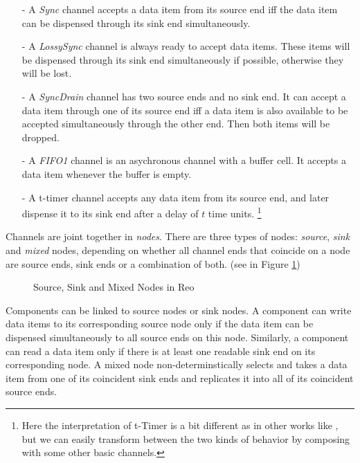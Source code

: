 \documentclass[conference, a4paper]{IEEEtran}
\begin{document}
\begin{itemize}
  \item [-] A \emph{Sync} channel accepts a data item from its source end iff the data item can be
    dispensed through its sink end simultaneously.
  \item [-] A \emph{LossySync} channel is always ready to accept data items. These items will be
    dispensed through its sink end simultaneously if possible, otherwise they will be lost.
  \item [-] A \emph{SyncDrain} channel has two source ends and no sink end. It can accept a data
    item through one of its source end iff a data item is also available to be accepted
    simultaneously through the other end. Then both items will be dropped.
  \item [-] A \emph{FIFO1} channel is an asychronous channel with a buffer cell. It accepts a
    data item whenever the buffer is empty. 
  \item [-] A t-timer channel accepts any data item from its source end, and later dispense it to
    its sink end after a delay of $t$ time units.
    \footnote{Here the interpretation of t-Timer is a bit different as in other works like
    \cite{DBLP:conf/sefm/ArbabBBR04, DBLP:conf/tase/Meng12}, but we can easily transform between the
    two kinds of behavior by composing with some other basic channels.}
\end{itemize}

Channels are joint together in \emph{nodes}. There are three types of nodes:
\emph{source}, \emph{sink} and \emph{mixed} nodes, depending on whether all channel ends that
coincide on a node are source ends, sink ends or a combination of both.
(see in Figure \ref{fig:node})

\begin{figure}[ht]
  \begin{center}
    
  \end{center}
  \caption{Source, Sink and Mixed Nodes in Reo}
  \label{fig:node}
\end{figure}

Components can be linked to source nodes or sink nodes. A component can write data items to its
corresponding source node only if the data item can be dispensed simultaneously to all source ends
on this node. Similarly, a component can read a data item only if there is at least one readable
sink end on its corresponding node. A mixed node non-determinstically selects and takes a data item
from one of its coincident sink ends and replicates it into all of its coincident source ends.
\end{document}
